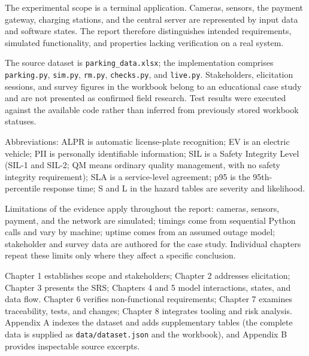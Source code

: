 \documentclass[12pt,a4paper,oneside]{report}
\begin{document}
The experimental scope is a terminal application. Cameras, sensors, the payment gateway, charging stations, and the central server are represented by input data and software states. The report therefore distinguishes intended requirements, simulated functionality, and properties lacking verification on a real system.

The source dataset is \texttt{parking\_data.xlsx}; the implementation comprises \texttt{parking.py}, \texttt{sim.py}, \texttt{rm.py}, \texttt{checks.py}, and \texttt{live.py}. Stakeholders, elicitation sessions, and survey figures in the workbook belong to an educational case study and are not presented as confirmed field research. Test results were executed against the available code rather than inferred from previously stored workbook statuses.

Abbreviations: ALPR is automatic license-plate recognition; EV is an electric vehicle; PII is personally identifiable information; SIL is a Safety Integrity Level (SIL-1 and SIL-2; QM means ordinary quality management, with no safety integrity requirement); SLA is a service-level agreement; p95 is the 95th-percentile response time; S and L in the hazard tables are severity and likelihood.

Limitations of the evidence apply throughout the report: cameras, sensors, payment, and the network are simulated; timings come from sequential Python calls and vary by machine; uptime comes from an assumed outage model; stakeholder and survey data are authored for the case study. Individual chapters repeat these limits only where they affect a specific conclusion.

Chapter 1 establishes scope and stakeholders; Chapter 2 addresses elicitation; Chapter 3 presents the SRS; Chapters 4 and 5 model interactions, states, and data flow. Chapter 6 verifies non-functional requirements; Chapter 7 examines traceability, tests, and changes; Chapter 8 integrates tooling and risk analysis. Appendix A indexes the dataset and adds supplementary tables (the complete data is supplied as \texttt{data/dataset.json} and the workbook), and Appendix B provides inspectable source excerpts.
\end{document}
